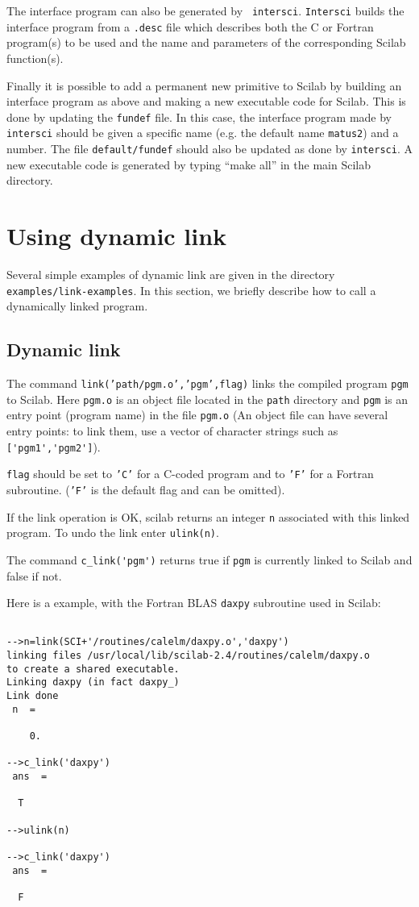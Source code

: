 The interface program can also be generated by {\tt
intersci}. {\tt Intersci} builds the interface
program from a {\tt .desc} file which describes both the C or 
Fortran program(s) to be used and the name and parameters of
the corresponding Scilab function(s). 

Finally  it is possible to add a permanent new primitive to Scilab
by building an interface program as above and making a new executable
code for Scilab. This is done by updating the {\tt fundef}
file. In this case, the interface program
made by {\tt intersci} should be given a specific name (e.g. 
the default name {\tt matus2}) and a number. The file 
{\tt default/fundef} should also be updated as done by {\tt intersci}.
A new executable code is generated by typing ``make all''
in the main Scilab directory.

\section{Using dynamic link}
Several simple examples of dynamic link are  given in the directory
{\tt examples/link-examples}. In this section, we briefly describe 
how to call a dynamically linked program. 
\subsection{Dynamic link}
\label{dynamiclink}
The command {\tt link('path/pgm.o','pgm',flag)}
links the compiled program {\tt pgm} to Scilab.
Here {\tt pgm.o} is an object file located in the {\tt path}
directory and {\tt pgm} is an entry point (program name) in the file {\tt pgm.o}
(An object file can have several entry points: to link them, use a vector of
character strings such as \verb!['pgm1','pgm2']!).

{\tt flag} should be set to {\tt 'C'} for a C-coded program
and to {\tt 'F'} for a Fortran subroutine. ({\tt 'F'} is
the default flag and can be omitted).

If the link operation is OK, scilab returns an integer {\tt n} associated
with this linked program. To undo the link enter {\tt ulink(n)}.

The command \verb!c_link('pgm')! returns true if {\tt pgm} is
currently linked to Scilab and false if not.

\noindent
Here is a example, with the Fortran BLAS {\tt daxpy} subroutine 
used in Scilab:
\begin{verbatim}

-->n=link(SCI+'/routines/calelm/daxpy.o','daxpy')
linking files /usr/local/lib/scilab-2.4/routines/calelm/daxpy.o
to create a shared executable.
Linking daxpy (in fact daxpy_)
Link done
 n  =
 
    0.  
 
-->c_link('daxpy')
 ans  =
 
  T  

-->ulink(n)
 
-->c_link('daxpy')
 ans  =
 
  F  
\end{verbatim}

